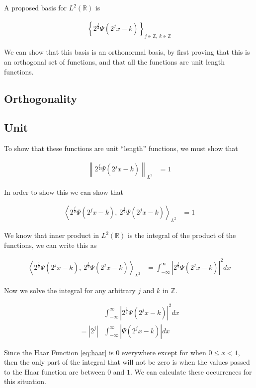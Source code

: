 \documentclass[12pt]{amsart}
\newcommand{\Z}{\mathbb{Z}}
\newcommand{\LP}{L^2(\mathbb{R})}
\newcommand{\norm}[1]{\left\lVert#1\right\rVert}
\newcommand{\abs}[1]{\left\lvert#1\right\rvert}
\begin{document}
A proposed basis for $\LP$ is

\begin{align}
  \left\{2^{\frac{j}{2}}\Psi\left(2^jx-k\right)\right\}_{j\in\Z,\ k\in\Z}
\end{align}

We can show that this basis is an orthonormal basis, by first proving that this
is an orthogonal set of functions, and that all the functions are unit length
functions.

\subsection{Orthogonality}%
\label{sub:orthogonality}

\subsection{Unit}%
\label{sub:unit}

To show that these functions are unit ``length'' functions, we must show that

\begin{align}
  \norm{2^\frac{j}{2}\Psi\left(2^jx-k\right)}_{L^2} &= 1
\end{align}

In order to show this we can show that

\begin{align}
  {\left<2^\frac{j}{2}\Psi\left(2^jx-k\right),\ 2^\frac{j}{2}\Psi\left(2^jx-k\right)\right>}_{L^2} &= 1
\end{align}

We know that inner product in $\LP$ is the integral of the product of the
functions, we can write this as

\begin{align}
  {\left<2^\frac{j}{2}\Psi\left(2^jx-k\right),\
  2^\frac{j}{2}\Psi\left(2^jx-k\right)\right>}_{L^2} &=
  \int_{-\infty}^{\infty} \abs{2^\frac{j}{2}\Psi\left(2^jx-k\right)}^2dx
\end{align}

Now we solve the integral for any arbitrary $j$ and $k$ in $\Z$.

\begin{align}
  &\int_{-\infty}^{\infty} \abs{2^\frac{j}{2}\Psi\left(2^jx-k\right)}^2dx\\
  =\abs{2^j} &\int_{-\infty}^{\infty} \abs{\Psi\left(2^jx-k\right)}dx
\end{align}

Since the Haar Function \eqref{eq:haar} is $0$ everywhere except for when $0\leq
x < 1$, then the only part of the integral that will not be zero is when the
values passed to the Haar function are between $0$ and $1$. We can calculate
these occurrences for this situation.
\end{document}
